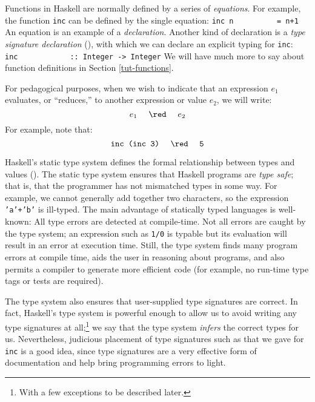 Functions in Haskell are normally defined by a series of {\em
equations}.  For example, the function \mbox{\tt inc} can be
defined by the single equation:
\bprog
\mbox{\tt inc\ n\ \ \ \ \ \ \ \ \ \ =\ n+1}
\eprog 
An equation is an example of a {\em declaration}.  Another kind of
declaration is a {\em type signature declaration}
(), with which we can declare an explicit typing
for \mbox{\tt inc}:
\bprog
\mbox{\tt inc\ \ \ \ \ \ \ \ \ \ \ \ ::\ Integer\ ->\ Integer}
\eprog 
We will have much more to say about function definitions in Section
\ref{tut-functions}.

For pedagogical purposes, when we wish to indicate that an expression
$e_1$ evaluates, or ``reduces,'' to another expression or value $e_2$,
we will write:
\[ e_1\ \ \ \ \red\ \ \ \ e_2 \]
For example, note that:
\[ \mbox{\tt inc\ (inc\ 3)}\ \ \ \ \red\ \ \ \ \mbox{\tt 5} \]

Haskell's static type system defines the formal relationship
between types and values ().  The static type
system ensures that Haskell programs are {\em type safe}; that is,
that the programmer has not mismatched types in some way.  For
example, we cannot generally add together two characters, so the
expression \mbox{\tt 'a'+'b'} is ill-typed.  The main advantage of statically
typed languages is well-known: All type errors are detected at
compile-time.  Not all errors are caught by the type system; an
expression such as \mbox{\tt 1/0} is typable but its evaluation will result in
an error at execution time.  Still, the type system finds many
program errors at compile time, aids the user in reasoning about
programs, and also permits a compiler to generate more efficient code
(for example, no run-time type tags or tests are required).

The type system also ensures that user-supplied type signatures are
correct.  In fact, Haskell's type system is powerful enough to allow
us to avoid writing any type signatures at all;\footnote{With a few
exceptions to be described later.} we say that the type
system {\em infers} the correct types for us.  Nevertheless, judicious
placement of type signatures such as that we gave for \mbox{\tt inc} is a good idea,
since type signatures are a very effective form of documentation and
help bring programming errors to light.


